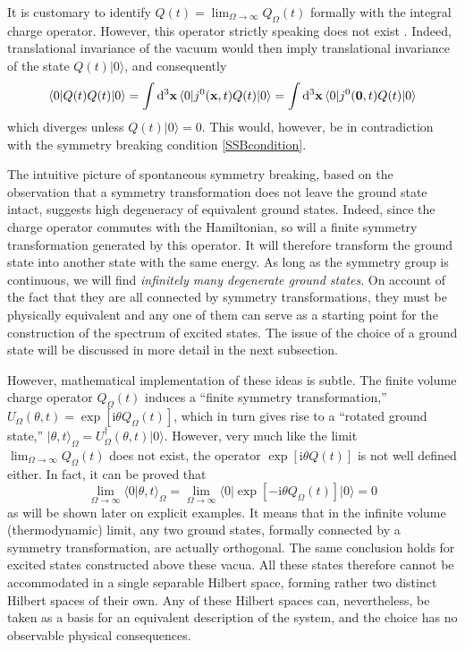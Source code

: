 \documentclass[final,2p,times,12pt,sort&compress]{elsarticle}
\newcommand\vek[1]{{\boldsymbol{\bf #1}}}   %
\newcommand\bra[1]{\langle#1\vert}          %
\newcommand\ket[1]{\vert#1\rangle}          %
\newcommand\braket[2]{\langle#1\vert#2\rangle} %
\newcommand\he[1]{#1^{\dagger}}             %
\newcommand\imag{\mathrm i}                 %
\newcommand\vt{\theta}
\newcommand\dthree{\mathop{{\rm d}^3\!}\nolimits} %
\begin{document}
It is customary to identify $Q(t)=\lim_{\Omega\to\infty}Q_\Omega(t)$ formally
with the integral charge operator. However, this operator strictly speaking does
not exist \cite{Fabri:1966fp}. Indeed, translational invariance of the vacuum
would then imply translational invariance of the state $Q(t)\ket0$, and
consequently
\begin{equation}
\bra0Q(t)Q(t)\ket0=\int\dthree\vek x\,\bra0j^0(\vek x,t)Q(t)\ket0=
\int\dthree\vek x\,\bra0j^0(\vek0,t)Q(t)\ket0
\end{equation}
which diverges unless $Q(t)\ket0=0$. This would, however, be in contradiction
with the symmetry breaking condition \eqref{SSBcondition}.

The intuitive picture of spontaneous symmetry breaking, based on the
observation that a symmetry transformation does not leave the ground state
intact, suggests high degeneracy of equivalent ground states. Indeed, since
the charge operator commutes with the Hamiltonian, so will a finite symmetry
transformation generated by this operator. It will therefore transform the
ground state into another state with the same energy. As long as the symmetry
group is continuous, we will find \emph{infinitely many degenerate ground
states}. On account of the fact that they are all connected by symmetry
transformations, they must be physically equivalent and any one of them can
serve as a starting point for the construction of the spectrum of excited
states. The issue of the choice of a ground state will be discussed in more
detail in the next subsection.

However, mathematical implementation of these ideas is subtle. The finite
volume charge operator $Q_\Omega(t)$ induces a ``finite symmetry
transformation,'' $U_\Omega(\vt,t)=\exp[\imag\vt Q_\Omega(t)]$, which in turn
gives rise to a ``rotated ground state,'' $\ket{\vt,t}_\Omega=\he
U_\Omega(\vt,t)\ket0$. However, very much like the limit
$\lim_{\Omega\to\infty}Q_\Omega(t)$ does not exist, the operator $\exp[\imag\vt
Q(t)]$ is not well defined either. In fact, it can be proved that
\begin{equation}
\lim_{\Omega\to\infty}\braket0{\vt,t}_\Omega=\lim_{\Omega\to\infty}
\bra0\exp[-\imag\vt Q_\Omega(t)]\ket0=0
\end{equation}
as will be shown later on explicit examples. It means that in the infinite
volume (thermodynamic) limit, any two ground states, formally connected by a
symmetry transformation, are actually orthogonal. The same
conclusion holds for excited states constructed above these vacua. All these
states therefore cannot be accommodated in a single separable Hilbert space,
forming rather two distinct Hilbert spaces of their own. Any of these Hilbert
spaces can, nevertheless, be taken as a basis for an equivalent description of
the system, and the choice has no observable physical consequences.
\end{document}
